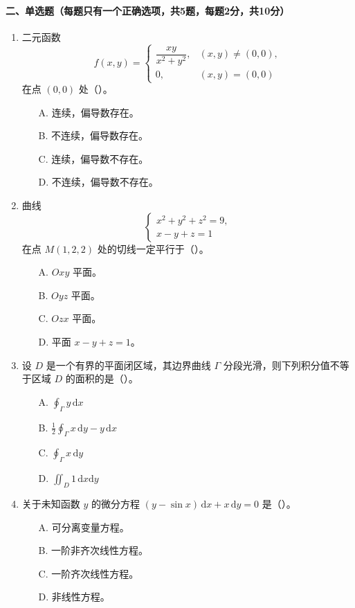 \paragraph*{二、单选题（每题只有一个正确选项，共5题，每题2分，共10分）}
\begin{enumerate}
  \item 二元函数
  \[
    f(x,y)=
    \begin{cases}
      \dfrac{xy}{x^2+y^2}, & (x,y)\ne(0,0),\\
      0, & (x,y)=(0,0)
    \end{cases}
  \]
  在点 \((0,0)\) 处（\quad）。
  \begin{enumerate}
    \item[A.] 连续，偏导数存在。
    \item[B.] 不连续，偏导数存在。
    \item[C.] 连续，偏导数不存在。
    \item[D.] 不连续，偏导数不存在。
  \end{enumerate}

  \item 曲线
  \[
    \begin{cases}
      x^2+y^2+z^2=9,\\
      x-y+z=1
    \end{cases}
  \]
  在点 \(M(1,2,2)\) 处的切线一定平行于（\quad）。
  \begin{enumerate}
    \item[A.] \(Oxy\) 平面。
    \item[B.] \(Oyz\) 平面。
    \item[C.] \(Ozx\) 平面。
    \item[D.] 平面 \(x-y+z=1\)。
  \end{enumerate}

  \item 设 \(D\) 是一个有界的平面闭区域，其边界曲线 \(\Gamma\) 分段光滑，则下列积分值不等于区域 \(D\) 的面积的是（\quad）。
  \begin{enumerate}
    \item[A.] \(\displaystyle \oint_\Gamma y\,\mathrm{d}x\)
    \item[B.] \(\displaystyle \frac12\oint_\Gamma x\,\mathrm{d}y-y\,\mathrm{d}x\)
    \item[C.] \(\displaystyle \oint_\Gamma x\,\mathrm{d}y\)
    \item[D.] \(\displaystyle \iint_D 1\,\mathrm{d}x\mathrm{d}y\)
  \end{enumerate}

  \item 关于未知函数 \(y\) 的微分方程 \((y-\sin x)\,\mathrm{d}x+x\,\mathrm{d}y=0\) 是（\quad）。
  \begin{enumerate}
    \item[A.] 可分离变量方程。
    \item[B.] 一阶非齐次线性方程。
    \item[C.] 一阶齐次线性方程。
    \item[D.] 非线性方程。
  \end{enumerate}


\end{enumerate}
